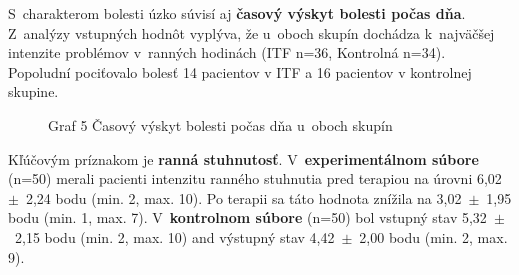 S~charakterom bolesti úzko súvisí aj \textbf{časový výskyt bolesti počas dňa}. Z~analýzy vstupných hodnôt vyplýva, že u~oboch skupín dochádza k~najväčšej intenzite problémov v~ranných hodinách (ITF n=36, Kontrolná n=34). Popoludní pociťovalo bolesť 14 pacientov v ITF a 16 pacientov v kontrolnej skupine.

\begin{figure}[H]
    \centering
    \caption*{Graf 5 Časový výskyt bolesti počas dňa u~oboch skupín}
    \label{fig:bolest_cas}
\end{figure}

Kľúčovým príznakom je \textbf{ranná stuhnutosť}. V~\textbf{experimentálnom súbore} (n=50) merali pacienti intenzitu ranného stuhnutia pred terapiou na úrovni 6,02~$\pm$~2,24 bodu (min. 2, max. 10). Po terapii sa táto hodnota znížila na 3,02~$\pm$~1,95 bodu (min. 1, max. 7). V~\textbf{kontrolnom súbore} (n=50) bol vstupný stav 5,32~$\pm$~2,15 bodu (min. 2, max. 10) and výstupný stav 4,42~$\pm$~2,00 bodu (min. 2, max. 9).

